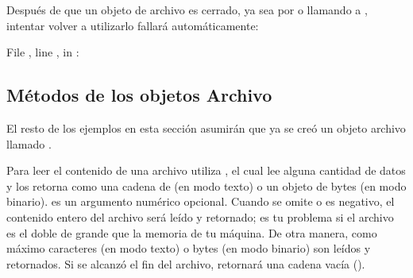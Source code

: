 \documentclass[a4,10pt,spanish]{sphinxmanual}
\begin{document}
\sphinxAtStartPar
Después de que un objeto de archivo es cerrado, ya sea por  o llamando a , intentar volver a utilizarlo fallará automáticamente:

\begin{sphinxVerbatim}[commandchars=\\\{\}]
  File , line , in 
: 
\end{sphinxVerbatim}


\subsection{Métodos de los objetos Archivo}
\label{\detokenize{tutorial/inputoutput:methods-of-file-objects}}\label{\detokenize{tutorial/inputoutput:tut-filemethods}}
\sphinxAtStartPar
El resto de los ejemplos en esta sección asumirán que ya se creó un objeto archivo llamado .

\sphinxAtStartPar
Para leer el contenido de una archivo utiliza , el cual lee alguna cantidad de datos y los retorna como una cadena de (en modo texto) o un objeto de bytes (en modo binario).  es un argumento numérico opcional.  Cuando se omite  o es negativo, el contenido entero del archivo será leído y retornado; es tu problema si el archivo es el doble de grande que la memoria de tu máquina.  De otra manera, como máximo  caracteres (en modo texto) o  bytes (en modo binario) son leídos y retornados. Si se alcanzó el fin del archivo,  retornará una cadena vacía ().

\begin{sphinxVerbatim}[commandchars=\\\{\}]
\end{sphinxVerbatim}
\end{document}
